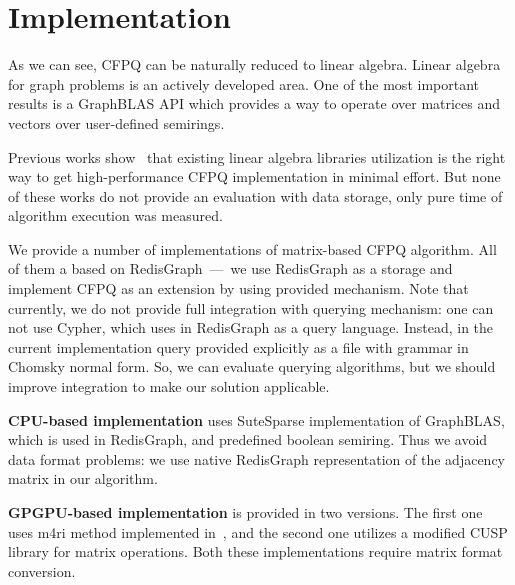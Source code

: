 \section{Implementation}

As we can see, CFPQ can be naturally reduced to linear algebra.
Linear algebra for graph problems is an actively developed area.
One of the most important results is a GraphBLAS API which provides a way to operate over matrices and vectors over user-defined semirings.

Previous works show~\cite{Mishin:2019:ECP:3327964.3328503, Azimov:2018:CPQ:3210259.3210264} that existing linear algebra libraries utilization is the right way to get high-performance CFPQ implementation in minimal effort.
But none of these works do not provide an evaluation with data storage, only pure time of algorithm execution was measured.

We provide a number of implementations of matrix-based CFPQ algorithm.
All of them a based on RedisGraph~---~we use RedisGraph as a storage and implement CFPQ as an extension by using provided mechanism.
Note that currently, we do not provide full integration with querying mechanism: one can not use Cypher, which uses in RedisGraph as a query language.
Instead, in the current implementation query provided explicitly as a file with grammar in Chomsky normal form.
So, we can evaluate querying algorithms, but we should improve integration to make our solution applicable.

\textbf{CPU-based implementation} uses SuteSparse implementation of GraphBLAS, which is used in RedisGraph, and predefined boolean semiring.
Thus we avoid data format problems: we use native RedisGraph representation of the adjacency matrix in our algorithm.

\textbf{GPGPU-based implementation} is provided in two versions.
The first one uses m4ri method implemented in~\cite{Mishin:2019:ECP:3327964.3328503}, and the second one utilizes a modified CUSP library for matrix operations.
Both these implementations require matrix format conversion.
